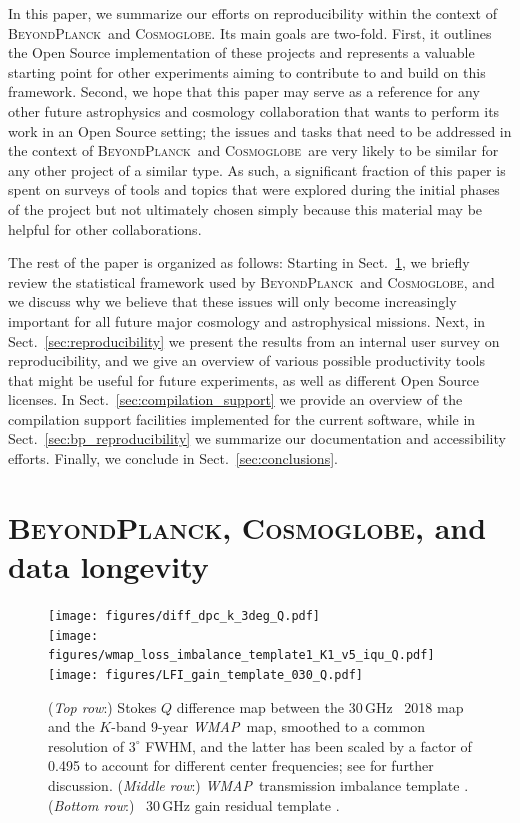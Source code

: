 \documentclass[twocolumn]{aa}
\def\WMAP{\textit{WMAP}}
\newcommand{\BP}{\textsc{BeyondPlanck}}
\newcommand{\cosmoglobe}{\textsc{Cosmoglobe}}
\begin{document}
In this paper, we summarize our efforts on reproducibility within the context of \BP\ and \cosmoglobe. Its main goals are two-fold. First, it outlines the Open Source implementation of these projects and represents a valuable starting point for other experiments aiming to contribute to and build on this framework. Second, we hope that this paper may serve as a reference for any other future astrophysics and cosmology collaboration that wants to perform its work in an Open Source setting; the issues and tasks that need to be addressed in the context of \BP\ and \cosmoglobe\ are very likely to be similar for any other project of a similar type. As such, a significant fraction of this paper is spent on surveys of tools and topics that were explored during the initial phases of the project but not ultimately chosen simply because this material may be helpful for other collaborations.

The rest of the paper is organized as follows: Starting in Sect.~\ref{sec:bp}, we briefly review the statistical framework used by \BP\ and \cosmoglobe, and we discuss why we believe that these issues will only become increasingly important for all future major cosmology and astrophysical missions. Next, in Sect.~\ref{sec:reproducibility} we present the results from an internal user survey on reproducibility, and we give an overview of various possible productivity tools that might be useful for future experiments, as well as different Open Source licenses. In Sect.~\ref{sec:compilation_support} we provide an overview of the compilation support facilities implemented for the current software, while in Sect.~\ref{sec:bp_reproducibility} we summarize our documentation and accessibility efforts. Finally, we conclude in Sect.~\ref{sec:conclusions}.

\section{\BP, \cosmoglobe, and data longevity}
\label{sec:bp}

\begin{figure}[t]
    \center
    \texttt{[image: figures/diff\_dpc\_k\_3deg\_Q.pdf]}\\
    \texttt{[image: figures/wmap\_loss\_imbalance\_template1\_K1\_v5\_iqu\_Q.pdf]}\\
    \texttt{[image: figures/LFI\_gain\_template\_030\_Q.pdf]}
    \caption{(\emph{Top row}:) Stokes $Q$ difference map between the 30\,GHz \Planck\ 2018 map and the $K$-band 9-year \WMAP\ map, smoothed to a common resolution of $3^{\circ}$ FWHM, and the latter has been scaled by a factor of 0.495 to account for different center frequencies; see \citet{bp07} for further discussion. (\emph{Middle row}:) \WMAP\ transmission imbalance template \citep{jarosik2007}. (\emph{Bottom row}:) \Planck\ 30\,GHz gain residual template \citep{planck2016-l02}.}
    \label{fig:diff_30_k}
\end{figure}
\end{document}
